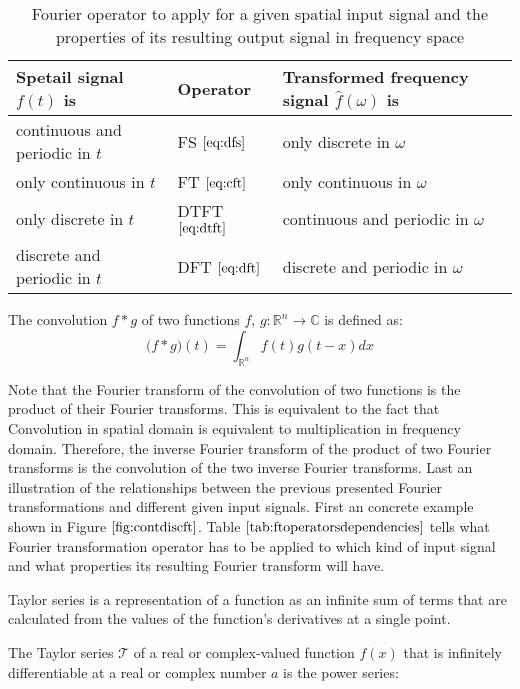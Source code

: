 \begin{table}[H]
    \begin{tabular}{l|l|l}
    \hline
    Spetail signal $f(t)$ is & Operator & Transformed frequency signal $\hat{f}(\omega)$ is\\
    \hline
    continuous and periodic in $t$ & FS $\ref{eq:dfs}$ & only discrete in $\omega$ \\
    only continuous in $t$ & FT $\ref{eq:cft}$ & only continuous in $\omega$\\
    only discrete in $t$ & DTFT $\ref{eq:dtft}$ & continuous and periodic in $\omega$\\
    discrete and periodic in $t$ & DFT $\ref{eq:dft}$ & discrete and periodic in $\omega$\\
    \hline
    \end{tabular}
\caption{Fourier operator to apply for a given spatial input signal and the properties of its resulting output signal in frequency space}
\label{tab:ftoperatorsdependencies}
\end{table}

The convolution $f*g$ of two functions $f$, $g$$\colon \mathds{R}^n \to \mathds{C} $ is defined as:  
\begin{equation}
  \mathcal (f*g)(t) = \int_{\mathds{R}^n} f(t)g(t-x) dx
  \label{eq:convolution}
\end{equation}

Note that the Fourier transform of the convolution of two functions is the product of their Fourier transforms. This is equivalent to the fact that Convolution in spatial domain is equivalent to multiplication in frequency domain. Therefore, the inverse Fourier transform of the product of two Fourier transforms is the convolution of the two inverse Fourier transforms.
Last an illustration of the relationships between the previous presented Fourier transformations and different given input signals. First an concrete example shown in Figure $\ref{fig:contdiscft}$. Table $\ref{tab:ftoperatorsdependencies}$ tells what Fourier transformation operator has to be applied to which kind of input signal and what properties its resulting Fourier transform will have.

Taylor series is a representation of a function as an infinite sum of terms that are calculated from the values of the function's derivatives at a single point.

The Taylor series $\mathcal T$ of a real or complex-valued function $f(x)$ that is infinitely differentiable at a real or complex number $a$ is the power series:

